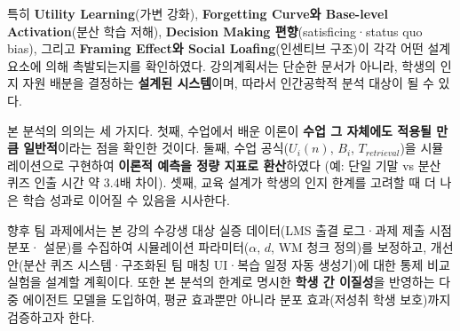 \documentclass[a4paper,11pt]{article}
\begin{document}
특히 \textbf{Utility Learning}(가변 강화), \textbf{Forgetting Curve와 Base-level
Activation}(분산 학습 저해), \textbf{Decision Making 편향}(satisficing·status quo bias),
그리고 \textbf{Framing Effect와 Social Loafing}(인센티브 구조)이 각각 어떤 설계 요소에
의해 촉발되는지를 확인하였다. 강의계획서는 단순한 문서가 아니라, 학생의 인지 자원
배분을 결정하는 \textbf{설계된 시스템}이며, 따라서 인간공학적 분석 대상이 될 수 있다.

본 분석의 의의는 세 가지다. 첫째, 수업에서 배운 이론이 \textbf{수업 그 자체에도 적용될
만큼 일반적}이라는 점을 확인한 것이다. 둘째, 수업 공식($U_i(n)$, $B_i$, $T_{retrieval}$)을
시뮬레이션으로 구현하여 \textbf{이론적 예측을 정량 지표로 환산}하였다 (예: 단일 기말 vs
분산 퀴즈 인출 시간 약 3.4배 차이). 셋째, 교육 설계가 학생의 인지 한계를 고려할 때
더 나은 학습 성과로 이어질 수 있음을 시사한다.

향후 팀 과제에서는 본 강의 수강생 대상 실증 데이터(LMS 출결 로그·과제 제출 시점 분포·
설문)를 수집하여 시뮬레이션 파라미터($\alpha$, $d$, WM 청크 정의)를 보정하고,
개선안(분산 퀴즈 시스템·구조화된 팀 매칭 UI·복습 일정 자동 생성기)에 대한 통제 비교
실험을 설계할 계획이다. 또한 본 분석의 한계로 명시한 \textbf{학생 간 이질성}을 반영하는
다중 에이전트 모델을 도입하여, 평균 효과뿐만 아니라 분포 효과(저성취 학생 보호)까지
검증하고자 한다.

\end{document}
